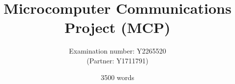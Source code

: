 \documentclass[10pt,twoside,openright]{report}
\title{Microcomputer Communications Project (MCP)\\
\vfill}
\author{Examination number: Y2265520\\
(Partner: Y1711791)}
\date{\vfill
3500 words}
\newenvironment{nowordcount}{}{}
\begin{document}
\maketitle

\newpage

\begin{nowordcount}
{\setlength{\parskip}{0.2\baselineskip}
    \tableofcontents
}

\newpage
{}
\end{nowordcount}








\appendix
\end{document}
